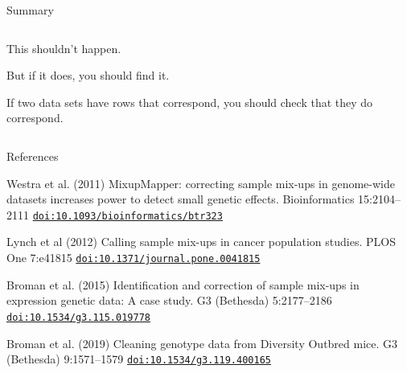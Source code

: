 \documentclass[aspectratio=169,12pt,t]{beamer}
\begin{document}
\begin{frame}[c]{Summary}

  \begin{columns}[T]

    \begin{column}[T]{0.5\textwidth}

      \bbi
    \item This shouldn't happen.
    \item But if it does, you should find it.
    \item If two data sets have rows that correspond, you should
      check that they {\vhilit do} correspond.
      \ei
    \end{column}


    \begin{column}[T]{0.5\textwidth}

      \vspace*{-0.1\textheight}
      \hspace*{0.273\textwidth} 

    \end{column}

    \end{columns}

  \note{
  }
\end{frame}



\begin{frame}[c]{References}

  \bbi

  \item Westra et al. (2011) MixupMapper: correcting sample mix-ups in
    genome-wide datasets increases power to detect small genetic
    effects. Bioinformatics 15:2104--2111
    \href{https://doi.org/10.1093/bioinformatics/btr323}{\tt doi:10.1093/bioinformatics/btr323}

  \item Lynch et al (2012) Calling sample mix-ups in cancer population
    studies. PLOS One 7:e41815
    \href{https://doi.org/10.1371/journal.pone.0041815}{\tt doi:10.1371/journal.pone.0041815}

  \item Broman et al. (2015) Identification and correction of sample
    mix-ups in expression genetic data: A case study. G3 (Bethesda)
    5:2177--2186
    \href{https://doi.org/10.1534/g3.115.019778}{\tt doi:10.1534/g3.115.019778}

  \item Broman et al. (2019) Cleaning genotype data from Diversity
    Outbred mice. G3 (Bethesda) 9:1571--1579
    \href{https://doi.org/10.1534/g3.119.400165}{\tt doi:10.1534/g3.119.400165}

  \ei


\end{frame}
\end{document}
